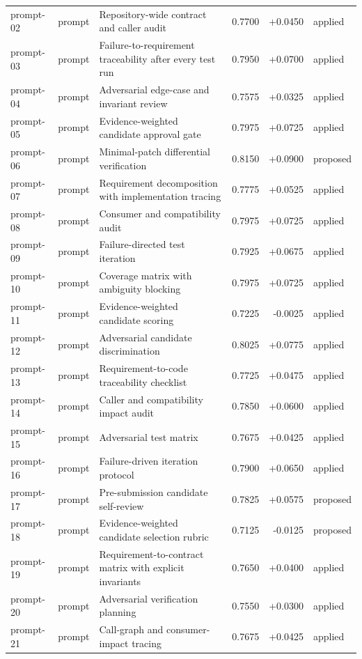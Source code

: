 \begin{center}
\begin{longtable}{llp{5.2cm}rrl}
prompt-02 & prompt & Repository-wide contract and caller audit & 0.7700 & +0.0450 & applied \\
prompt-03 & prompt & Failure-to-requirement traceability after every test run & 0.7950 & +0.0700 & applied \\
prompt-04 & prompt & Adversarial edge-case and invariant review & 0.7575 & +0.0325 & applied \\
prompt-05 & prompt & Evidence-weighted candidate approval gate & 0.7975 & +0.0725 & applied \\
prompt-06 & prompt & Minimal-patch differential verification & 0.8150 & +0.0900 & proposed \\
prompt-07 & prompt & Requirement decomposition with implementation tracing & 0.7775 & +0.0525 & applied \\
prompt-08 & prompt & Consumer and compatibility audit & 0.7975 & +0.0725 & applied \\
prompt-09 & prompt & Failure-directed test iteration & 0.7925 & +0.0675 & applied \\
prompt-10 & prompt & Coverage matrix with ambiguity blocking & 0.7975 & +0.0725 & applied \\
prompt-11 & prompt & Evidence-weighted candidate scoring & 0.7225 & -0.0025 & applied \\
prompt-12 & prompt & Adversarial candidate discrimination & 0.8025 & +0.0775 & applied \\
prompt-13 & prompt & Requirement-to-code traceability checklist & 0.7725 & +0.0475 & applied \\
prompt-14 & prompt & Caller and compatibility impact audit & 0.7850 & +0.0600 & applied \\
prompt-15 & prompt & Adversarial test matrix & 0.7675 & +0.0425 & applied \\
prompt-16 & prompt & Failure-driven iteration protocol & 0.7900 & +0.0650 & applied \\
prompt-17 & prompt & Pre-submission candidate self-review & 0.7825 & +0.0575 & proposed \\
prompt-18 & prompt & Evidence-weighted candidate selection rubric & 0.7125 & -0.0125 & proposed \\
prompt-19 & prompt & Requirement-to-contract matrix with explicit invariants & 0.7650 & +0.0400 & applied \\
prompt-20 & prompt & Adversarial verification planning & 0.7550 & +0.0300 & applied \\
prompt-21 & prompt & Call-graph and consumer-impact tracing & 0.7675 & +0.0425 & applied \\

\end{longtable}
\end{center}
